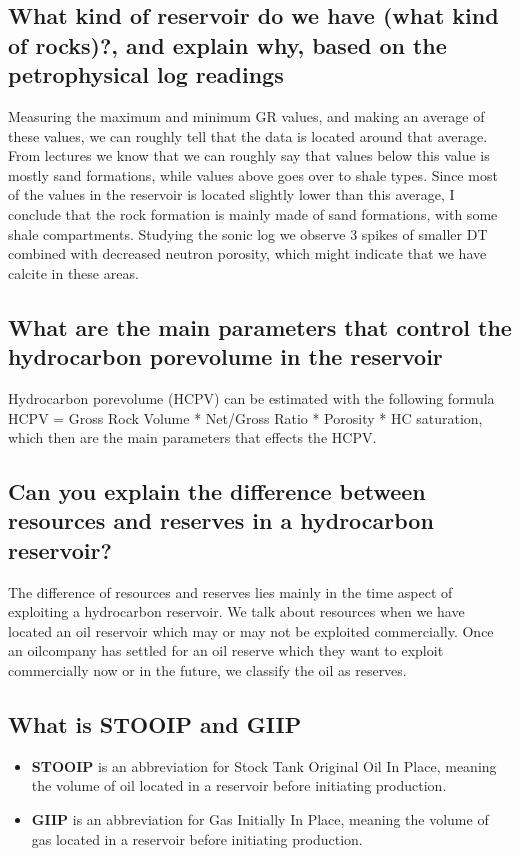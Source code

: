 \documentclass[a4paper,norsk]{article}
\begin{document}
\subsection*{What kind of reservoir do we have (what kind of rocks)?, and explain why, based on the petrophysical log readings}
Measuring the maximum and minimum GR values, and making an average of these values, we can roughly tell that the data is located around that average. From lectures we know that we can roughly say that values below this value is mostly sand formations, while values above goes over to shale types. Since most of the values in the reservoir is located slightly lower than this average, I conclude that the rock formation is mainly made of sand formations, with some shale compartments. \newline
Studying the sonic log we observe 3 spikes of smaller DT combined with decreased neutron porosity, which might indicate that we have calcite in these areas.

\subsection*{What are the main parameters that control the hydrocarbon porevolume in the reservoir}
Hydrocarbon porevolume (HCPV) can be estimated with the following formula \newline
HCPV = Gross Rock Volume * Net/Gross Ratio * Porosity * HC saturation, which then are the main parameters that effects the HCPV.

\subsection*{Can you explain the difference between resources and reserves in a hydrocarbon reservoir?}  
The difference of resources and reserves lies mainly in the time aspect of exploiting a hydrocarbon reservoir. We talk about resources when we have located an oil reservoir which may or may not be exploited commercially. Once an oilcompany has settled for an oil reserve which they want to exploit commercially now or in the future, we classify the oil as reserves. 

\subsection*{What is STOOIP and GIIP}
\begin{itemize}
\item \textbf{STOOIP} is an abbreviation for Stock Tank Original Oil In Place, meaning the volume of oil located in a reservoir before initiating production.
\item \textbf{GIIP} is an abbreviation for Gas Initially In Place, meaning the volume of gas located in a reservoir before initiating production.
\end{itemize}
 
\end{document}
